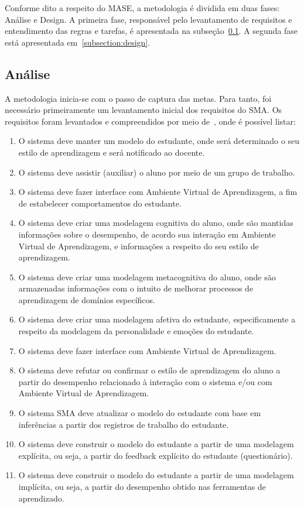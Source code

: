 Conforme dito a respeito do MASE, a metodologia é dividida em duas fases: Análise e Design. A primeira fase, responsável pelo levantamento de requisitos e entendimento das regras e tarefas, é apresentada na subseção~\ref{subsection:analise}. A segunda fase está apresentada em~\ref{subsection:design}.

\subsection{Análise}\label{subsection:analise}

A metodologia inicia-se com o passo de captura das metas. Para tanto, foi necessário primeiramente um levantamento inicial dos requisitos do SMA. Os requisitos foram levantados e compreendidos por meio de~\cite{editalFrank}, onde é possível listar:

\begin{enumerate}
	\item O sistema deve manter um modelo do estudante, onde será determinado o seu estilo de aprendizagem e será notíficado ao docente.
	\item O sistema deve assistir (auxiliar) o aluno por meio de um grupo de trabalho.
	\item O sistema deve fazer interface com Ambiente Virtual de Aprendizagem, a fim de estabelecer comportamentos do estudante.
	\item O sistema deve criar uma modelagem cognitiva do aluno, onde são mantidas informações sobre o desempenho, de acordo sua interação em Ambiente Virtual de Aprendizagem, e informações a respeito do seu estilo de aprendizagem.
	\item O sistema deve criar uma modelagem metacognitiva do aluno, onde são armazenadas informações com o intuito de melhorar processos de aprendizagem de domínios específicos.
	\item O sistema deve criar uma modelagem afetiva do estudante, especificamente a respeito da modelagem da personalidade e emoções do estudante.
	\item O sistema deve fazer interface com Ambiente Virtual de Aprendizagem.
	\item O sistema deve refutar ou confirmar o estilo de aprendizagem do aluno a partir do desempenho relacionado à interação com o sistema e/ou com Ambiente Virtual de Aprendizagem.
	\item O sistema SMA deve atualizar o modelo do estudante com base em inferências a partir dos registros de trabalho do estudante.
	\item O sistema deve construir o modelo do estudante a partir de uma modelagem explícita, ou seja, a partir do feedback explícito do estudante (questionário).
	\item O sistema deve construir o modelo do estudante a partir de uma modelagem implícita, ou seja, a partir do desempenho obtido nas ferramentas de aprendizado.
\end{enumerate}

